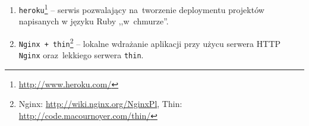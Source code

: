 \begin{enumerate}
  \item \texttt{heroku}\footnote{\url{http://www.heroku.com/}} -- serwis pozwalający na~tworzenie deploymentu projektów napisanych w języku Ruby ,,w~chmurze''.
  \item \texttt{Nginx + thin}\footnote{Nginx: \url{http://wiki.nginx.org/NginxPl}, Thin: \url{http://code.macournoyer.com/thin/}} -- lokalne wdrażanie aplikacji przy użycu serwera HTTP \texttt{Nginx} oraz~lekkiego serwera \texttt{thin}.
\end{enumerate}
